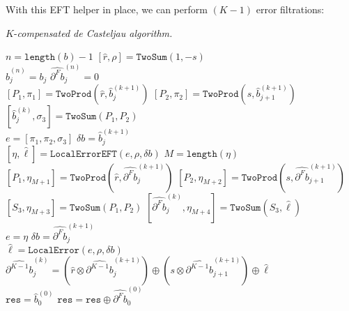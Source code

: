\documentclass[letterpaper,10pt]{article}
\theoremstyle{definition}
\begin{document}
\noindent With this EFT helper in place, we can perform \((K - 1)\)
error filtrations:

\begin{algorithm}[H]
  \caption{\(K\)-\textit{compensated de Casteljau algorithm.}}

  \begin{algorithmic}
      \State \(n = \texttt{length}(b) - 1\)
      \State \(\left[\widehat{r}, \rho\right] = \mathtt{TwoSum}(1, -s)\)
      \\
        \State \(\widehat{b}_j^{(n)} = b_j\)
          \State \(\widehat{\partial^F b}_j^{(n)} = 0\)
        \EndFor
      \EndFor
      \\
          \State \(\left[P_1, \pi_1\right] = \mathtt{TwoProd}\left(
              \widehat{r}, \widehat{b}_j^{(k + 1)}\right)\)
          \State \(\left[P_2, \pi_2\right] = \mathtt{TwoProd}\left(
              s, \widehat{b}_{j + 1}^{(k + 1)}\right)\)
          \State \(\left[\widehat{b}_j^{(k)}, \sigma_3\right] =
              \mathtt{TwoSum}(P_1, P_2)\)
          \\
          \State \(e = \left[\pi_1, \pi_2, \sigma_3\right]\)
          \State \(\delta b = \widehat{b}_j^{(k + 1)}\)
          \\
            \State \(\left[\eta, \widehat{\ell}\right] =
                \mathtt{LocalErrorEFT}(e, \rho, \delta b)\)
            \State \(M = \texttt{length}(\eta)\)
            \\
            \State \(\left[P_1, \eta_{M + 1}\right] = \mathtt{TwoProd}\left(
                \widehat{r}, \widehat{\partial^F b}_j^{(k + 1)}\right)\)
            \State \(\left[P_2, \eta_{M + 2}\right] = \mathtt{TwoProd}\left(
                s, \widehat{\partial^F b}_{j + 1}^{(k + 1)}\right)\)
            \State \(\left[S_3, \eta_{M + 3}\right] =
                \mathtt{TwoSum}(P_1, P_2)\)
            \State \(\left[\widehat{\partial^F b}_j^{(k)}, \eta_{M + 4}\right]
                = \mathtt{TwoSum}\left(S_3, \widehat{\ell}\right)\)
            \\
            \State \(e = \eta\)
            \State \(\delta b = \widehat{\partial^F b}_j^{(k + 1)}\)
          \EndFor
          \\
          \State \(\widehat{\ell} =
                \mathtt{LocalError}(e, \rho, \delta b)\)
          \State \(\widehat{\partial^{K - 1} b}_j^{(k)} =
              \left(\widehat{r} \otimes
              \widehat{\partial^{K - 1} b}_j^{(k + 1)}\right) \oplus
              \left(s \otimes \widehat{\partial^{K - 1} b}_{j + 1}^{(k + 1)}
              \right) \oplus
              \widehat{\ell}\)
        \EndFor
      \EndFor
      \\
      \State \(\mathtt{res} = \widehat{b}_0^{(0)}\)
        \State \(\mathtt{res} = \mathtt{res} \oplus
            \widehat{\partial^F b}_0^{(0)}\)
      \EndFor
    \EndFunction
  \end{algorithmic}
\end{algorithm}
\end{document}
